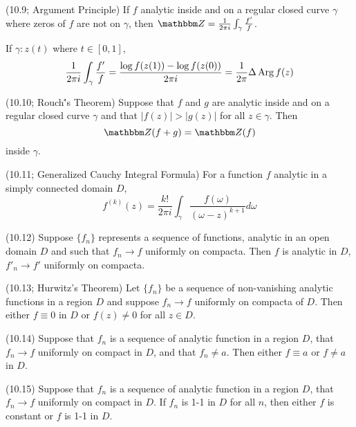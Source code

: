 \documentclass{article}
\begin{document}
\begin{corollary}(10.9; Argument Principle)
  If \(f\) analytic inside and on a regular closed curve \(\gamma\)
  where zeros of \(f\) are not on \(\gamma\),
  then \(\bbZ = \frac{1}{2\pi i}\int_\gamma\frac{f'}{f}\).

  If \(\gamma: z(t)\) where \(t \in [0, 1]\),
  \[\frac{1}{2\pi i}\int_\gamma\frac{f'}{f}
  = \frac{\log f(z(1)) - \log f(z(0))}{2 \pi i}
  = \frac{1}{2\pi} \Delta \operatorname{Arg} f(z)\]
\end{corollary}

\begin{theorem}(10.10; Rouch\''s Theorem)
  Suppose that \(f\) and \(g\) are analytic inside and
  on a regular closed curve \(\gamma\)
  and that \(|f(z)| > |g(z)|\) for all \(z \in \gamma\).
  Then
  \[\bbZ(f + g) = \bbZ(f)\]
  inside \(\gamma\).
\end{theorem}

\begin{theorem}(10.11; Generalized Cauchy Integral Formula)
  For a function \(f\) analytic in a simply connected domain \(D\),
  \[f^{(k)}(z) = \frac{k!}{2\pi i}\int_\gamma \frac{f(\omega)}{(\omega - z)^{k + 1}} d\omega\]
\end{theorem}

\begin{theorem}(10.12)
  Suppose \(\{f_n\}\) represents a sequence of functions,
  analytic in an open domain \(D\)
  and such that \(f_n \to f\) uniformly on compacta.
  Then \(f\) is analytic in \(D\),
  \(f'_n \to f'\) uniformly on compacta.
\end{theorem}

\begin{theorem}(10.13; Hurwitz's Theorem)
  Let \(\{f_n\}\) be a sequence of non-vanishing analytic functions
  in a region \(D\) and suppose \(f_n \to f\) uniformly on compacta of \(D\).
  Then either \(f \equiv 0\) in \(D\) or \(f(z) \neq 0\)
  for all \(z \in D\).
\end{theorem}
\begin{corollary}(10.14)
  Suppose that \(f_n\) is a sequence of analytic function in a region \(D\),
  that \(f_n \to f\) uniformly on compact in \(D\),
  and that \(f_n \neq a\).
  Then either \(f \equiv a\) or \(f \neq a\) in \(D\).
\end{corollary}
\begin{theorem}(10.15)
  Suppose that \(f_n\) is a sequence of analytic function in a region \(D\),
  that \(f_n \to f\) uniformly on compact in \(D\).
  If \(f_n\) is 1-1 in \(D\) for all \(n\),
  then either \(f\) is constant or \(f\) is 1-1 in \(D\).
\end{theorem}
\end{document}
